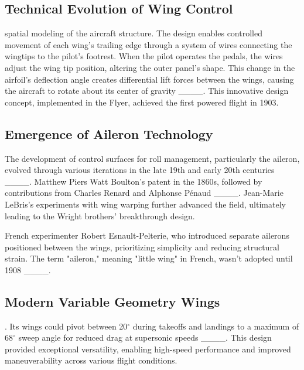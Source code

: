\subsection{Technical Evolution of Wing Control}
 spatial modeling of the aircraft structure. The design enables controlled movement of each wing's trailing edge through a system of wires connecting the wingtips to the pilot's footrest. When the pilot operates the pedals, the wires adjust the wing tip position, altering the outer panel's shape. This change in the airfoil's deflection angle creates differential lift forces between the wings, causing the aircraft to rotate about its center of gravity ____. This innovative design concept, implemented in the Flyer, achieved the first powered flight in 1903.

\subsection{Emergence of Aileron Technology}
The development of control surfaces for roll management, particularly the aileron, evolved through various iterations in the late 19th and early 20th centuries ____.  Matthew Piers Watt Boulton's patent in the 1860s, followed by contributions from Charles Renard and Alphonse Pénaud ____. Jean-Marie LeBris's experiments with wing warping further advanced the field, ultimately leading to the Wright brothers' breakthrough design.

 French experimenter Robert Esnault-Pelterie, who introduced separate ailerons positioned between the wings, prioritizing simplicity and reducing structural strain. The term "aileron," meaning "little wing" in French, wasn't adopted until 1908 ____. 

\subsection{Modern Variable Geometry Wings}
. Its wings could pivot between 20$^{\circ}$ during takeoffs and landings to a maximum of 68$^{\circ}$ sweep angle for reduced drag at supersonic speeds ____. This design provided exceptional versatility, enabling high-speed performance and improved maneuverability across various flight conditions.

